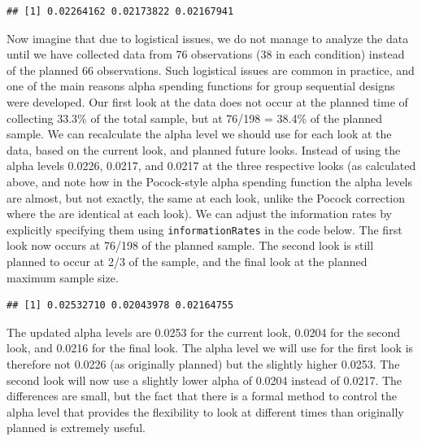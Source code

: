 \documentclass[
  oneside]{book}
\newenvironment{Shaded}{\begin{snugshade}}{\end{snugshade}}
\newcommand{\AttributeTok}[1]{\textcolor[rgb]{0.77,0.63,0.00}{#1}}
\newcommand{\DecValTok}[1]{\textcolor[rgb]{0.00,0.00,0.81}{#1}}
\newcommand{\FloatTok}[1]{\textcolor[rgb]{0.00,0.00,0.81}{#1}}
\newcommand{\FunctionTok}[1]{\textcolor[rgb]{0.00,0.00,0.00}{#1}}
\newcommand{\NormalTok}[1]{#1}
\newcommand{\OtherTok}[1]{\textcolor[rgb]{0.56,0.35,0.01}{#1}}
\newcommand{\SpecialCharTok}[1]{\textcolor[rgb]{0.00,0.00,0.00}{#1}}
\newcommand{\StringTok}[1]{\textcolor[rgb]{0.31,0.60,0.02}{#1}}
\begin{document}
\begin{verbatim}
## [1] 0.02264162 0.02173822 0.02167941
\end{verbatim}

Now imagine that due to logistical issues, we do not manage to analyze the data until we have collected data from 76 observations (38 in each condition) instead of the planned 66 observations. Such logistical issues are common in practice, and one of the main reasons alpha spending functions for group sequential designs were developed. Our first look at the data does not occur at the planned time of collecting 33.3\% of the total sample, but at 76/198 = 38.4\% of the planned sample. We can recalculate the alpha level we should use for each look at the data, based on the current look, and planned future looks. Instead of using the alpha levels 0.0226, 0.0217, and 0.0217 at the three respective looks (as calculated above, and note how in the Pocock-style alpha spending function the alpha levels are almost, but not exactly, the same at each look, unlike the Pocock correction where the are identical at each look). We can adjust the information rates by explicitly specifying them using \texttt{informationRates} in the code below. The first look now occurs at 76/198 of the planned sample. The second look is still planned to occur at 2/3 of the sample, and the final look at the planned maximum sample size.

\begin{Shaded}
\end{Shaded}

\begin{verbatim}
## [1] 0.02532710 0.02043978 0.02164755
\end{verbatim}

The updated alpha levels are 0.0253 for the current look, 0.0204 for the second look, and 0.0216 for the final look. The alpha level we will use for the first look is therefore not 0.0226 (as originally planned) but the slightly higher 0.0253. The second look will now use a slightly lower alpha of 0.0204 instead of 0.0217. The differences are small, but the fact that there is a formal method to control the alpha level that provides the flexibility to look at different times than originally planned is extremely useful.
\end{document}
